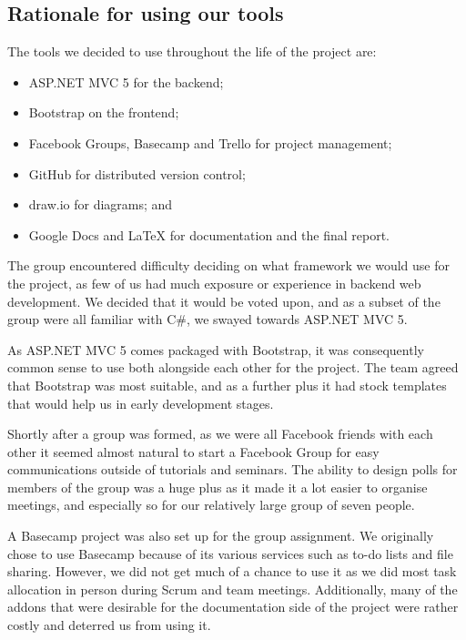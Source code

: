 \documentclass[a4paper,titlepage,12pt]{article}
\begin{document}
\newpage

\subsection{Rationale for using our tools}

The tools we decided to use throughout the life of the project are:

\begin{itemize}
	\item ASP.NET MVC 5 for the backend;
	\item Bootstrap on the frontend;
	\item Facebook Groups, Basecamp and Trello for project management;
	\item GitHub for distributed version control;
	\item draw.io for diagrams; and
	\item Google Docs and \LaTeX{} for documentation and the final report.
\end{itemize}

The group encountered difficulty deciding on what framework we would use for
the project, as few of us had much exposure or experience in backend web
development. We decided that it would be voted upon, and as a subset of the
group were all familiar with C\#, we swayed towards ASP.NET MVC 5.

As ASP.NET MVC 5 comes packaged with Bootstrap, it was consequently common
sense to use both alongside each other for the project. The team agreed that
Bootstrap was most suitable, and as a further plus it had stock templates that
would help us in early development stages.

Shortly after a group was formed, as we were all Facebook friends with each
other it seemed almost natural to start a Facebook Group for easy
communications outside of tutorials and seminars. The ability to design polls
for members of the group was a huge plus as it made it a lot easier to organise
meetings, and especially so for our relatively large group of seven people.

A Basecamp project was also set up for the group assignment. We originally
chose to use Basecamp because of its various services such as to-do lists and
file sharing. However, we did not get much of a chance to use it as we did most
task allocation in person during Scrum and team meetings. Additionally, many of
the addons that were desirable for the documentation side of the project were
rather costly and deterred us from using it.
\end{document}
